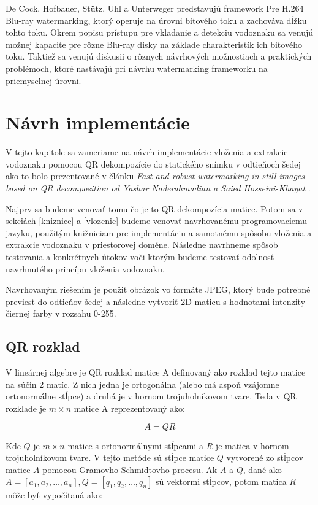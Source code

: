 De Cock, Hofbauer, Stütz, Uhl a Unterweger \cite{DeCock2015} predstavujú framework Pre H.264 Blu-ray watermarking, ktorý operuje na úrovni bitového toku a zachováva dĺžku tohto toku. Okrem popisu prístupu pre vkladanie a detekciu vodoznaku sa venujú možnej kapacite pre rôzne Blu-ray disky na základe charakteristík ich bitového toku. Taktiež sa venujú diskusii o rôznych návrhových možnostiach a praktických problémoch, ktoré nastávajú pri návrhu watermarking frameworku na priemyselnej úrovni.

\chapter{Návrh implementácie}
V tejto kapitole sa zameriame na návrh implementácie vloženia a extrakcie vodoznaku pomocou QR dekompozície do statického snímku v odtieňoch šedej ako to bolo prezentované v článku {\it Fast and robust watermarking in still images based on QR decomposition od Yashar Naderahmadian a Saied Hosseini-Khayat} \cite{QRdecomposition}.

Najprv sa budeme venovať tomu čo je to QR dekompozícia matice. Potom sa v sekciách \ref{kniznice} a \ref{vlozenie} budeme venovať navrhovanému programovaciemu jazyku, použitým knižniciam pre implementáciu a samotnému spôsobu vloženia a extrakcie vodoznaku v priestorovej doméne. Následne navrhneme spôsob testovania a konkrétnych útokov voči ktorým budeme testovať odolnosť navrhnutého princípu vloženia vodoznaku.

Navrhovaným riešením je použiť obrázok vo formáte JPEG, ktorý bude potrebné previesť do odtieňov šedej a následne vytvoriť 2D maticu s hodnotami intenzity čiernej farby v rozsahu 0-255.

\section{QR rozklad}
V lineárnej algebre je QR rozklad matice A definovaný ako rozklad tejto matice na súčin 2 matíc. Z nich jedna je ortogonálna (alebo má aspoň vzájomne ortonormálne stĺpce) a druhá je v hornom trojuholníkovom tvare. Teda v QR rozklade je $m \times n$ matice A reprezentovaný ako:

\begin{equation}
A = QR
\end{equation}

Kde $Q$ je $m \times n$ matice s ortonormálnymi stĺpcami a $R$ je matica v hornom trojuholníkovom tvare. V tejto metóde sú stĺpce matice $Q$ vytvorené zo stĺpcov matice $A$ pomocou Gramovho-Schmidtovho procesu. Ak $A$ a $Q$, dané ako $A=[a_1, a_2, \dots, a_n ], Q=[q_1, q_2, \dots, q_n ] $ sú vektormi stĺpcov, potom matica $R$ môže byť vypočítaná ako:

